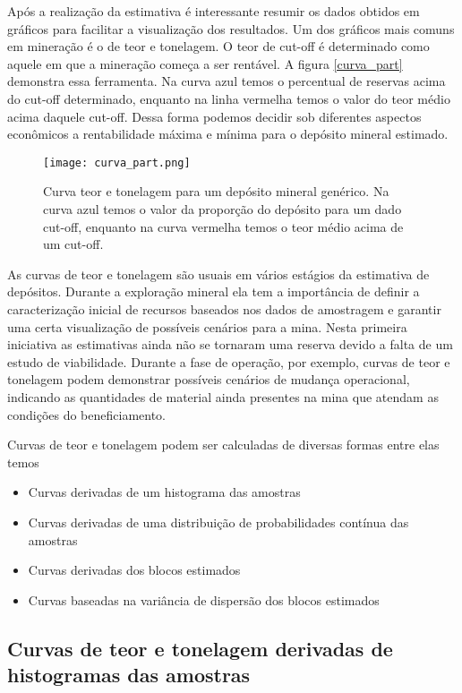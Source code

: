 Após a realização da estimativa é interessante resumir os dados obtidos em gráficos para facilitar a visualização dos resultados. Um dos gráficos mais comuns em mineração é o de teor e tonelagem. O  teor de cut-off é determinado como aquele em que a mineração começa a ser rentável. A figura \eqref{curva_part} demonstra essa ferramenta. Na curva azul temos o percentual de reservas acima do cut-off determinado, enquanto na linha vermelha temos o valor do teor médio acima daquele cut-off. Dessa forma podemos decidir sob diferentes aspectos econômicos a rentabilidade máxima e mínima para o depósito mineral estimado. 

\begin{figure}[H]
	\centering
	\texttt{[image: curva\_part.png]}	
	\caption{Curva teor e tonelagem para um depósito mineral genérico. Na curva azul temos o valor da proporção do depósito para um dado cut-off, enquanto na curva vermelha temos o teor médio acima de um cut-off.}
	\label{curva_part}
\end{figure}

As curvas de teor e tonelagem são usuais em vários estágios da estimativa de depósitos. Durante a exploração mineral ela tem a importância de definir a caracterização inicial de recursos baseados nos dados de amostragem e garantir uma certa visualização de possíveis cenários para a mina. Nesta primeira iniciativa as estimativas ainda não se tornaram uma reserva devido a falta de um estudo de viabilidade. Durante a fase de operação, por exemplo, curvas de teor e tonelagem podem demonstrar possíveis cenários de mudança operacional, indicando as quantidades de material ainda presentes na mina que atendam as condições do beneficiamento. 


 Curvas de teor e tonelagem podem ser calculadas de diversas formas entre elas temos

\begin{itemize}
	\item Curvas derivadas de um histograma das amostras
	\item Curvas derivadas de uma distribuição de probabilidades contínua das amostras
	\item Curvas derivadas dos blocos estimados
	\item Curvas baseadas na variância de dispersão dos blocos estimados
\end{itemize}

\subsection{Curvas de teor e tonelagem derivadas de histogramas das amostras} \label{teor_t1}

